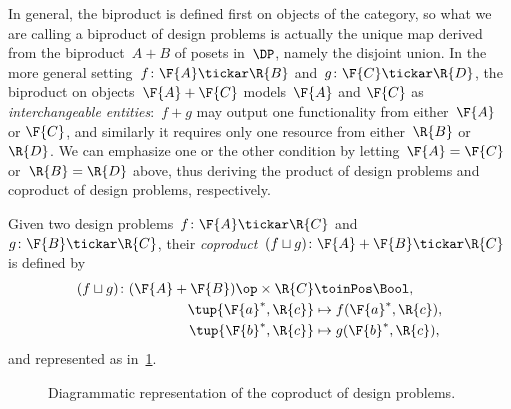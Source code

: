 In general, the biproduct is defined first on objects of the category, so what we are calling a biproduct of design
problems is actually the unique map derived from the biproduct~$A + B$ of posets in~$\DP$, namely the disjoint union. In the more general setting~$f\colon \F{A} \tickar \R{B}$ and~$g \colon \F{C} \tickar \R{D}$, the biproduct on objects~$\F{A} + \F{C}$ models~$\F{A}$ and $\F{C}$ as \emph{interchangeable entities}:~$f+g$ may output one functionality from either~$\F{A}$ or $\F{C}$, and similarly it requires only one resource from either~$\R{B}$ or~$\R{D}$. We can emphasize one or the other condition by letting~$\F{A} = \F{C}$ or~$\R{B} =\R{D}$ above, thus deriving the product of design problems and coproduct of design problems, respectively.


\begin{definition}
\label{define:coproduct}
Given two design problems~$f\colon \F{A} \tickar \R{C}$ and~$g \colon \F{B} \tickar \R{C}$, their \emph{coproduct}~$(f \sqcup g)\colon \F{A} + \F{B} \tickar \R{C}$ is defined by
\begin{equation}
\begin{aligned}
    (f \sqcup g) \colon (\F{A} + \F{B})\op \times \R{C} & \toinPos \Bool,  \\
            \tup{ \F{a}^*, \R{c}} & \mapsto f(\F{a}^*, \R{c}), \\
            \tup{ \F{b}^*, \R{c}} & \mapsto g(\F{b}^*, \R{c}),
\end{aligned}
\end{equation}
and represented as in~\cref{fig:coproductdp}.

\begin{figure}[h!]
\begin{center}
\end{center}
\caption{Diagrammatic representation of the coproduct of design problems. \label{fig:coproductdp}}
\end{figure}
\end{definition}

